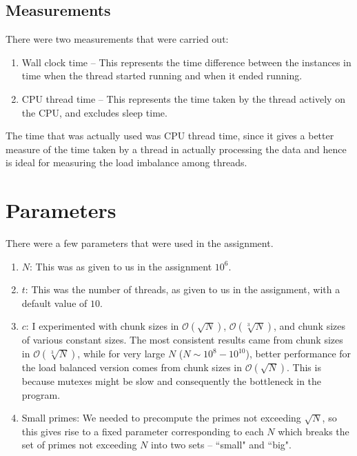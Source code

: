 \documentclass[a4paper]{article}
\newcommand{\mc}{\mathcal}
\begin{document}
\subsection{Measurements}

There were two measurements that were carried out:

\begin{enumerate}
    \item Wall clock time -- This represents the time difference between the instances in time when the thread started running and when it ended running.
    \item CPU thread time -- This represents the time taken by the thread actively on the CPU, and excludes sleep time.
\end{enumerate}

The time that was actually used was CPU thread time, since it gives a better measure of the time taken by a thread in actually processing the data and hence is ideal for measuring the load
imbalance among threads.

\section{Parameters}

There were a few parameters that were used in the assignment.

\begin{enumerate}
    \item $N$: This was as given to us in the assignment $10^6$.
    \item $t$: This was the number of threads, as given to us in the assignment, with a default value of $10$.
    \item $c$: I experimented with chunk sizes in $\mc{O}(\sqrt{N})$, $\mc{O}(\sqrt[3]{N})$, and chunk sizes of various constant sizes. The most consistent results came
        from chunk sizes in $\mc{O}(\sqrt[3]{N})$, while for very large $N$ ($N \sim 10^8 - 10^{10}$), better performance for the load balanced version comes from chunk sizes in $\mc{O}(\sqrt{N})$. This is because mutexes
        might be slow and consequently the bottleneck in the program.
    \item Small primes: We needed to precompute the primes not exceeding $\sqrt{N}$, so this gives rise to a fixed parameter corresponding to each $N$ which breaks the set of primes not
        exceeding $N$ into two sets -- ``small" and ``big".
\end{enumerate}
\end{document}
